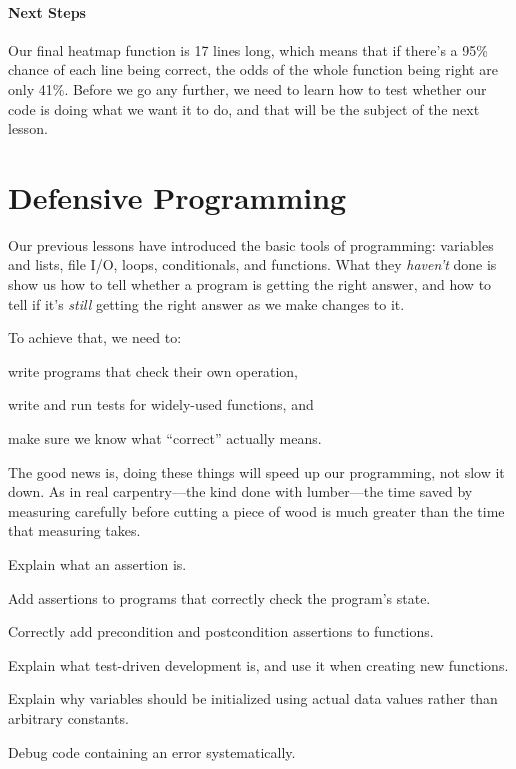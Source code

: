 \documentclass{book}
\begin{document}
\mbox{}\paragraph{Next Steps}

Our final heatmap function is 17 lines long, which means that if there's
a 95\% chance of each line being correct, the odds of the whole function
being right are only 41\%. Before we go any further, we need to learn
how to test whether our code is doing what we want it to do, and that
will be the subject of the next lesson.

\section{Defensive Programming}

Our previous lessons have introduced the basic tools of programming:
variables and lists, file I/O, loops, conditionals, and functions. What
they \emph{haven't} done is show us how to tell whether a program is
getting the right answer, and how to tell if it's \emph{still} getting
the right answer as we make changes to it.

To achieve that, we need to:

\begin{swcitemize}
\item
  write programs that check their own operation,
\item
  write and run tests for widely-used functions, and
\item
  make sure we know what ``correct'' actually means.
\end{swcitemize}

The good news is, doing these things will speed up our programming, not
slow it down. As in real carpentry---the kind done with lumber---the
time saved by measuring carefully before cutting a piece of wood is much
greater than the time that measuring takes.

\begin{objectives}
\begin{swcitemize}
\item
  Explain what an assertion is.
\item
  Add assertions to programs that correctly check the program's state.
\item
  Correctly add precondition and postcondition assertions to functions.
\item
  Explain what test-driven development is, and use it when creating new
  functions.
\item
  Explain why variables should be initialized using actual data values
  rather than arbitrary constants.
\item
  Debug code containing an error systematically.
\end{swcitemize}
\end{objectives}
\end{document}
